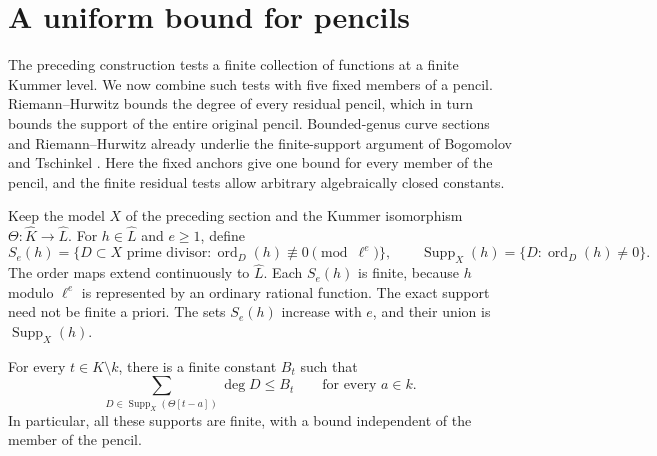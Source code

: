 \section{A uniform bound for pencils}\label{sec:pencil}

The preceding construction tests a finite collection of functions at a
finite Kummer level.  We now combine such tests with five fixed members
of a pencil.  Riemann--Hurwitz bounds the degree of every residual
pencil, which in turn bounds the support of the entire original pencil.
Bounded-genus curve sections and Riemann--Hurwitz already underlie the
finite-support argument of Bogomolov and Tschinkel
\cite[Section~6, proof of Proposition~6.1]{BT2011}.
Here the fixed anchors give one bound for every member of the pencil,
and the finite residual tests allow arbitrary algebraically closed constants.

Keep the model $X$ of the preceding section and the Kummer isomorphism
$\Theta:\widehat K\to\widehat L$.
For $h\in\widehat L$ and $e\ge1$, define
\[
 S_e(h)=\{D\subset X\text{ prime divisor}:
                \operatorname{ord}_D(h)\not\equiv0\pmod{\ell^e}\},
 \qquad
 \operatorname{Supp}_X(h)=\{D:\operatorname{ord}_D(h)\ne0\}.
\]
The order maps extend continuously to $\widehat L$.
Each $S_e(h)$ is finite, because $h$ modulo $\ell^e$ is represented by an
ordinary rational function.  The exact support need not be finite a
priori.  The sets $S_e(h)$ increase with $e$, and their union is
$\operatorname{Supp}_X(h)$.

\begin{theorem}\label{pencil:uniform}
For every $t\in K\setminus k$, there is a finite constant $B_t$ such that
\[
 \sum_{D\in\operatorname{Supp}_X(\Theta[t-a])}\deg D\le B_t
 \qquad\text{for every }a\in k.
\]
In particular, all these supports are finite, with a bound independent
of the member of the pencil.
\end{theorem}

